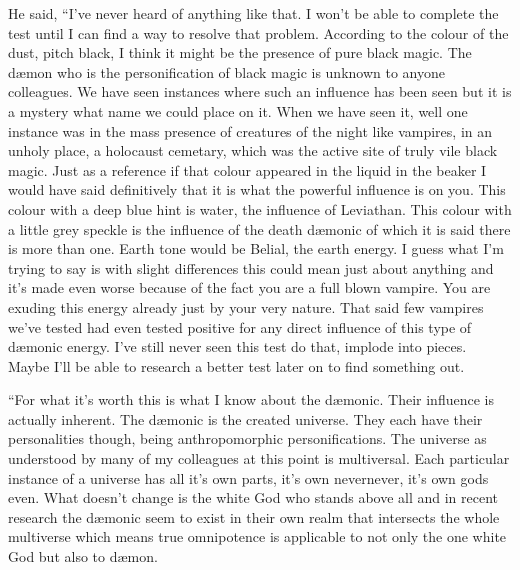 He said, ``I've never heard of anything like that. I won't be able to complete the test until I can find a way to resolve that problem. According to the colour of the dust, pitch black, I think it might be the presence of pure black magic. The d\ae mon who is the personification of black magic is unknown to anyone colleagues. We have seen instances where such an influence has been seen but it is a mystery what name we could place on it. When we have seen it, well one instance was in the mass presence of creatures of the night like vampires, in an unholy place, a holocaust cemetary, which was the active site of truly vile black magic. Just as a reference if that colour appeared in the liquid in the beaker I would have said definitively that it is what the powerful influence is on you. This colour with a deep blue hint is water, the influence of Leviathan. This colour with a little grey speckle is the influence of the death d\ae monic of which it is said there is more than one. Earth tone would be Belial, the earth energy. I guess what I'm trying to say is with slight differences this could mean just about anything and it's made even worse because of the fact you are a full blown vampire. You are exuding this energy already just by your very nature. That said few vampires we've tested had even tested positive for any direct influence of this type of d\ae monic energy. I've still never seen this test do that, implode into pieces.  Maybe I'll be able to research a better test later on to find something out.

``For what it's worth this is what I know about the d\ae monic. Their influence is actually inherent. The d\ae monic is the created universe. They each have their personalities though, being anthropomorphic personifications. The universe as understood by many of my colleagues at this point is multiversal. Each particular instance of a universe has all it's own parts, it's own nevernever, it's own gods even. What doesn't change is the white God who stands above all and in recent research the d\ae monic seem to exist in their own realm that intersects the whole multiverse which means true omnipotence is applicable to not only the one white God but also to d\ae mon.

